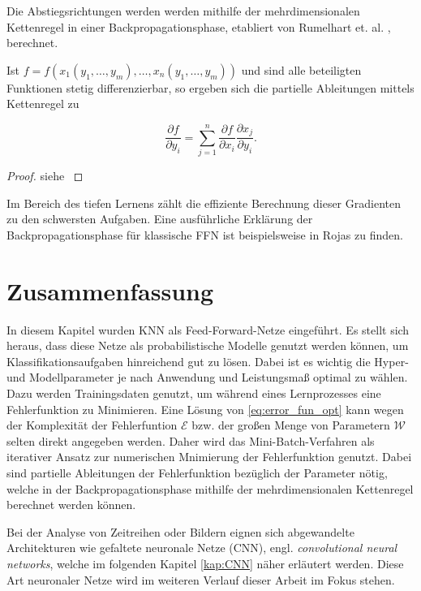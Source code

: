 Die Abstiegsrichtungen werden werden mithilfe der mehrdimensionalen Kettenregel in einer Backpropagationsphase, etabliert von Rumelhart et. al. \cite{MLPbook}, berechnet.
\begin{satz}
    \label{chainrule}
    Ist $f=f(x_1(y_1, \ldots, y_m), \ldots, x_n(y_1, \ldots, y_m))$ und sind alle beteiligten Funktionen stetig differenzierbar, so ergeben sich die partielle Ableitungen mittels Kettenregel zu

    \begin{equation*}
        \frac{\partial f}{\partial y_i}=\sum_{j=1}^n \frac{\partial f}{\partial x_i} \frac{\partial x_j}{\partial y_i} .
    \end{equation*}
\end{satz}

\begin{proof}
    siehe \cite{forster2017analysis}
\end{proof}
Im Bereich des tiefen Lernens zählt die effiziente Berechnung dieser Gradienten zu den schwersten Aufgaben. Eine ausführliche Erklärung der Backpropagationsphase für klassische FFN ist beispielsweise in Rojas\cite{rojas96neural} zu finden. 

\section{Zusammenfassung}
\label{abs:NN_conc}
In diesem Kapitel wurden KNN als Feed-Forward-Netze eingeführt. Es stellt sich heraus, dass diese Netze als probabilistische Modelle genutzt werden können, um Klassifikationsaufgaben hinreichend gut zu lösen. Dabei ist es wichtig die Hyper- und Modellparameter je nach Anwendung und Leistungsmaß optimal zu wählen. Dazu werden Trainingsdaten genutzt, um während eines Lernprozesses eine Fehlerfunktion zu Minimieren. Eine Lösung von \ref{eq:error_fun_opt} kann wegen der Komplexität der Fehlerfuntion $\mathcal{E}$ bzw. der großen Menge von Parametern $\mathcal{W}$ selten direkt angegeben werden\cite{blum1992training}. Daher wird das Mini-Batch-Verfahren als iterativer Ansatz zur numerischen Mnimierung der Fehlerfunktion genutzt. Dabei sind partielle Ableitungen der Fehlerfunktion bezüglich der Parameter nötig, welche in der Backpropagationsphase mithilfe der mehrdimensionalen Kettenregel berechnet werden können. 

Bei der Analyse von Zeitreihen oder Bildern eignen sich abgewandelte Architekturen wie gefaltete neuronale Netze (CNN), engl. \textit{convolutional neural networks}, welche im folgenden Kapitel \ref{kap:CNN} näher erläutert werden. Diese Art neuronaler Netze wird im weiteren Verlauf dieser Arbeit im Fokus stehen.


    





